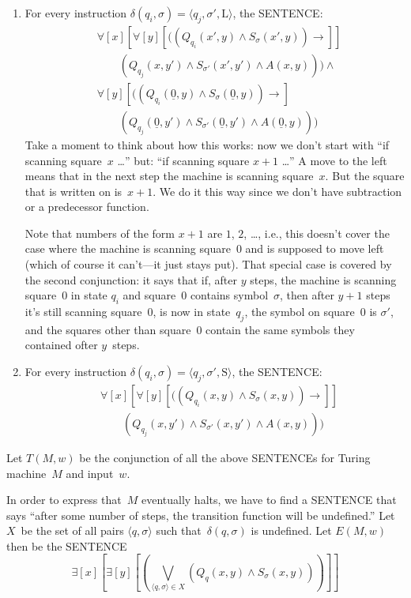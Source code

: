 \documentclass[10pt,a4paper]{article}
\newcommand*{\olup}[1]{\MakeUppercase{#1}}
\theoremstyle{plain}
\theoremstyle{definition}
\theoremstyle{remark}
\newcommand*{\ollabel}[1]{\label{#1}}
\providecommand{\lif}{\mathbin{\rightarrow}}
\providecommand{\lforall}{\mathord{\forall}}
\providecommand{\lexists}{\mathord{\exists}}
\providecommand{\Obj}{}
\providecommand{\tuple}[1]{\langle #1 \rangle}
\providecommand{\num}[1]{\underline{#1}}
\providecommand{\TMstay}{\mathrm{S}}
\providecommand{\TMleft}{\mathrm{L}}
\begin{document}
\begin{enumerate}
\begin{enumerate}
\item \ollabel{rep-left} For every instruction $\delta(q_i, \sigma) =
  \tuple{q_j, \sigma', \TMleft}$, the \olup{sentence}:
\begin{align*}
& \lforall[x][\lforall[y][
    ((\Obj Q_{q_i}(x', y) \land \Obj S_{\sigma}(x', y)) \lif {}]]\\
& \qquad   (\Obj Q_{q_j}(x, y') \land \Obj S_{\sigma'}(x', y') \land
A(x, y))) \land {}\\
& \lforall[y][((\Obj Q_{q_i}(\num{0}, y) \land \Obj S_{\sigma}(\num{0},
    y)) \lif {}]\\
& \qquad (\Obj Q_{q_j}(\num{0}, y') \land \Obj S_{\sigma'}(\num{0},
  y') \land A(\num{0}, y)))
\end{align*}
Take a moment to think about how this works: now we don't start with
``if scanning square~$x$ \dots'' but: ``if scanning square $x+1$
\dots'' A move to the left means that in the next step the machine is
scanning square~$x$.  But the square that is written on is~$x+1$.  We
do it this way since we don't have subtraction or a predecessor
function.

Note that numbers of the form $x+1$ are $1$, $2$, \dots, i.e., this
doesn't cover the case where the machine is scanning square~$0$ and is
supposed to move left (which of course it can't---it just stays
put). That special case is covered by the second conjunction: it says
that if, after $y$ steps, the machine is scanning square~$0$ in state
$q_i$ and square~$0$ contains symbol~$\sigma$, then after $y+1$ steps
it's still scanning square~$0$, is now in state~$q_j$, the symbol on
square~$0$ is $\sigma'$, and the squares other than square~$0$ contain
the same symbols they contained ofter $y$~steps.
\item \ollabel{rep-stay} For every instruction $\delta(q_i, \sigma) =
  \tuple{q_j, \sigma', \TMstay}$, the \olup{sentence}:
\begin{align*}
& \lforall[x][\lforall[y][(
   (\Obj Q_{q_i}(x, y) \land \Obj S_{\sigma}(x, y)) \lif {}]] \\
&\qquad   (\Obj Q_{q_j}(x, y') \land \Obj S_{\sigma'}(x, y') \land
A(x, y)))
\end{align*}
\end{enumerate}
\end{enumerate}
Let $T(M, w)$ be the conjunction of all the above \olup{sentence}s for Turing
machine~$M$ and input~$w$.

In order to express that~$M$ eventually halts, we have to find a
\olup{sentence} that says ``after some number of steps, the transition
function will be undefined.''  Let $X$~be the set of all pairs
$\tuple{q, \sigma}$ such that~$\delta(q, \sigma)$ is undefined.  Let
$E(M, w)$ then be the \olup{sentence}
\[
\lexists[x][\lexists[y][(\bigvee_{\tuple{q, \sigma} \in
      X}(\Obj Q_q(x, y) \land \Obj S_\sigma(x, y)))]]
\]
\end{document}
